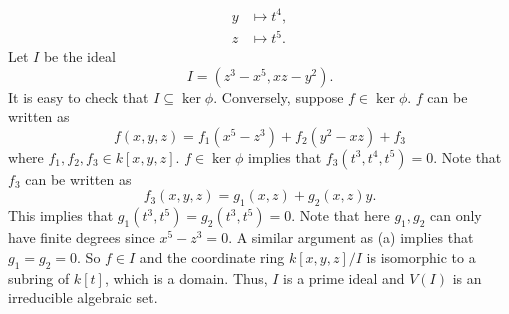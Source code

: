\documentclass[letterpaper, 12pt]{article}
\begin{document}
\begin{solution}
\begin{enumerate}[(a)]
\begin{align*}
         y&\mapsto t^4,\\ 
         z&\mapsto t^5.
\end{align*}
Let \(I\) be the ideal 
\[I=(z^3-x^5,xz-y^2).\]
It is easy to check that \(I\subseteq \ker\phi\). Conversely, suppose \(f\in \ker\phi\). \(f\) can be written as 
\[f(x,y,z)=f_1(x^5-z^3)+f_2(y^2-xz)+f_3\]
where \(f_1,f_2,f_3\in k[x,y,z]\). \(f\in \ker\phi\) implies that \(f_3(t^3,t^4,t^5)=0\). Note that \(f_3\) can be written as 
\[f_3(x,y,z)=g_1(x,z)+g_2(x,z)y.\]
This implies that \(g_1(t^3,t^5)=g_2(t^3,t^5)=0\). Note that here \(g_1,g_2\) can only have finite degrees since \(x^5-z^3=0\). A similar argument as (a) implies that \(g_1=g_2=0\). So \(f\in I\) and the coordinate ring \(k[x,y,z]/I\) is isomorphic to a subring of \(k[t]\), which is a domain. Thus, \(I\) is a prime ideal and \(V(I)\) is an irreducible algebraic set. 
\end{enumerate}
\end{solution}
\end{document}
